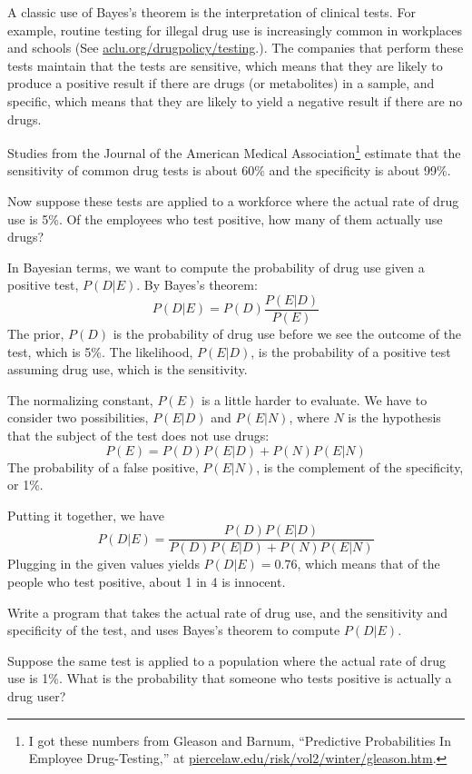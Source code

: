\documentclass[12pt]{book}
\begin{document}
A classic use of Bayes's theorem is the interpretation of clinical
tests.  For example, routine testing for illegal drug use is
increasingly common in workplaces and schools (See
\url{aclu.org/drugpolicy/testing}.).  The companies that
perform these tests maintain that the tests are sensitive, which means
that they are likely to produce a positive result if there are drugs
(or metabolites) in a sample, and specific, which means that they are
likely to yield a negative result if there are no drugs.

Studies from the Journal of the American Medical
Association\footnote{I got these numbers from Gleason and Barnum,
  ``Predictive Probabilities In Employee Drug-Testing,'' at
  \url{piercelaw.edu/risk/vol2/winter/gleason.htm}.} estimate that
the sensitivity of common drug tests is about 60\% and the specificity
is about 99\%.

Now suppose these tests are applied to a workforce where the
actual rate of drug use is 5\%.  Of the employees who test positive,
how many of them actually use drugs?

In Bayesian terms, we want to compute the probability of
drug use given a positive test, $P(D|E)$.  By Bayes's theorem:
%
\[ P(D|E) = P(D) \frac{P(E|D)}{P(E)} \]
%
The prior, $P(D)$ is the probability of drug use before we
see the outcome of the test, which is 5\%.
The likelihood, $P(E|D)$, is the probability
of a positive test assuming drug use, which is the sensitivity.

The normalizing constant, $P(E)$ is a little harder to evaluate.  We
have to consider two possibilities, $P(E|D)$ and $P(E|N)$, where $N$
is the hypothesis that the subject of the test does not use drugs:
%
\[ P(E) = P(D) P(E|D) + P(N) P(E|N) \]
%
The probability of a false positive, $P(E|N)$, is the complement
of the specificity, or 1\%.

Putting it together, we have
%
\[ P(D|E) = \frac{P(D) P(E|D)}{P(D) P(E|D) + P(N) P(E|N)}\]
%
Plugging in the given values yields $P(D|E) = 0.76$, which means
that of the people who test positive, about 1 in 4 is innocent. 

\begin{ex}

Write a program that takes the actual rate of drug use, and the
sensitivity and specificity of the test, and uses Bayes's theorem
to compute $P(D|E)$.

Suppose the same test is applied to a population where the actual
rate of drug use is 1\%.  What is the probability that someone
who tests positive is actually a drug user?

\end{ex}
\end{document}

